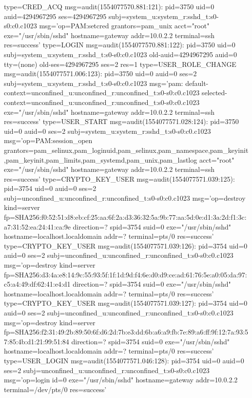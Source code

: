 \documentclass[]{report}
\newenvironment{Shaded}{}{}
\newcommand{\NormalTok}[1]{#1}
\begin{document}
\begin{Shaded}
\begin{Highlighting}[]
\NormalTok{type=CRED_ACQ msg=audit(1554077570.881:121): pid=3750 uid=0 auid=4294967295 ses=4294967295 subj=system_u:system_r:sshd_t:s0-s0:c0.c1023 msg='op=PAM:setcred grantors=pam_unix acct="root" exe="/usr/sbin/sshd" hostname=gateway addr=10.0.2.2 terminal=ssh res=success'}
\NormalTok{type=LOGIN msg=audit(1554077570.881:122): pid=3750 uid=0 subj=system_u:system_r:sshd_t:s0-s0:c0.c1023 old-auid=4294967295 auid=0 tty=(none) old-ses=4294967295 ses=2 res=1}
\NormalTok{type=USER_ROLE_CHANGE msg=audit(1554077571.006:123): pid=3750 uid=0 auid=0 ses=2 subj=system_u:system_r:sshd_t:s0-s0:c0.c1023 msg='pam: default-context=unconfined_u:unconfined_r:unconfined_t:s0-s0:c0.c1023 selected-context=unconfined_u:unconfined_r:unconfined_t:s0-s0:c0.c1023 exe="/usr/sbin/sshd" hostname=gateway addr=10.0.2.2 terminal=ssh res=success'}
\NormalTok{type=USER_START msg=audit(1554077571.028:124): pid=3750 uid=0 auid=0 ses=2 subj=system_u:system_r:sshd_t:s0-s0:c0.c1023 msg='op=PAM:session_open grantors=pam_selinux,pam_loginuid,pam_selinux,pam_namespace,pam_keyinit,pam_keyinit,pam_limits,pam_systemd,pam_unix,pam_lastlog acct="root" exe="/usr/sbin/sshd" hostname=gateway addr=10.0.2.2 terminal=ssh res=success'}
\NormalTok{type=CRYPTO_KEY_USER msg=audit(1554077571.039:125): pid=3754 uid=0 auid=0 ses=2 subj=unconfined_u:unconfined_r:unconfined_t:s0-s0:c0.c1023 msg='op=destroy kind=server fp=SHA256:f0:52:51:d8:eb:cf:25:aa:6f:2a:d3:36:32:5a:9b:77:aa:5d:0e:d1:3a:2d:f1:3c:a7:31:52:ea:24:41:ca:9e direction=? spid=3754 suid=0  exe="/usr/sbin/sshd" hostname=localhost.localdomain addr=? terminal=pts/0 res=success'}
\NormalTok{type=CRYPTO_KEY_USER msg=audit(1554077571.039:126): pid=3754 uid=0 auid=0 ses=2 subj=unconfined_u:unconfined_r:unconfined_t:s0-s0:c0.c1023 msg='op=destroy kind=server fp=SHA256:d3:4a:e8:14:9c:55:93:5f:1f:1d:9d:f4:6e:d0:d9:ce:ad:61:76:5e:a0:05:da:97:c5:a4:49:df:62:41:e4:d1 direction=? spid=3754 suid=0  exe="/usr/sbin/sshd" hostname=localhost.localdomain addr=? terminal=pts/0 res=success'}
\NormalTok{type=CRYPTO_KEY_USER msg=audit(1554077571.039:127): pid=3754 uid=0 auid=0 ses=2 subj=unconfined_u:unconfined_r:unconfined_t:s0-s0:c0.c1023 msg='op=destroy kind=server fp=SHA256:f2:31:49:2b:89:50:6f:d6:2d:7b:e3:dd:6b:a6:a9:fb:7e:89:a6:ff:9f:12:7a:93:57:85:4b:d1:21:99:51:84 direction=? spid=3754 suid=0  exe="/usr/sbin/sshd" hostname=localhost.localdomain addr=? terminal=pts/0 res=success'}
\NormalTok{type=USER_LOGIN msg=audit(1554077571.046:128): pid=3754 uid=0 auid=0 ses=2 subj=unconfined_u:unconfined_r:unconfined_t:s0-s0:c0.c1023 msg='op=login id=0 exe="/usr/sbin/sshd" hostname=gateway addr=10.0.2.2 terminal=/dev/pts/0 res=success'}

\end{Highlighting}
\end{Shaded}
\end{document}
